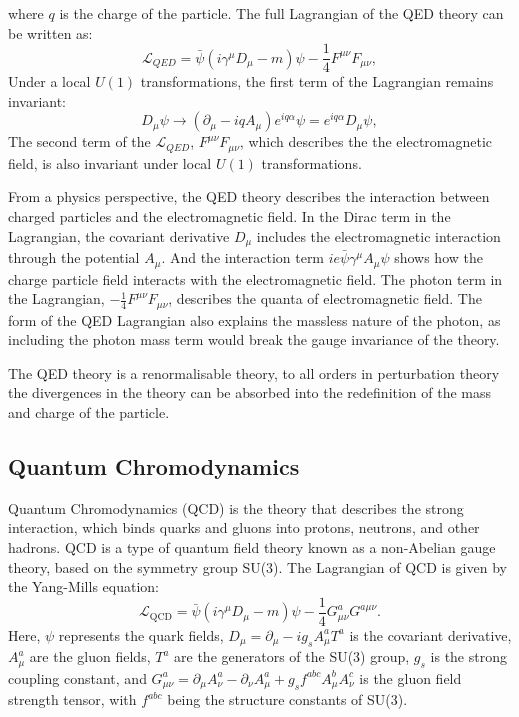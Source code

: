         where $q$ is the charge of the particle. The full Lagrangian of the QED theory can be written as:
        \begin{equation}
            \mathcal{L}_{QED} = \bar{\psi}(i\gamma^{\mu}D_{\mu} - m)\psi - \frac{1}{4}F^{\mu\nu}F_{\mu\nu},
        \end{equation}
        Under a local $U(1)$ transformations, the first term of the Lagrangian remains invariant:
        \begin{equation}
            D_{\mu}\psi \rightarrow (\partial_{\mu} - iqA_{\mu})e^{iq\alpha}\psi = e^{iq\alpha}D_{\mu}\psi,
        \end{equation}
        The second term of the $\mathcal{L}_{QED}$, $F^{\mu\nu}F_{\mu\nu}$, which describes the the electromagnetic field, 
        is also invariant under local $U(1)$ transformations. 

        From a physics perspective, the QED theory describes the interaction between charged particles and the electromagnetic field.
        In the Dirac term in the Lagrangian, the covariant derivative \( D_\mu \) includes the electromagnetic interaction through the potential \( A_\mu \).
        And the interaction term \( ie \bar{\psi} \gamma^\mu A_\mu \psi \) shows how the charge particle field interacts with the electromagnetic field.
        The photon term in the Lagrangian, \( -\frac{1}{4} F^{\mu\nu} F_{\mu\nu} \), describes the quanta of electromagnetic field.
        The form of the QED Lagrangian also explains the massless nature of the photon, as including the photon mass term would break the gauge invariance of the theory.

        The QED theory is a renormalisable theory, to all orders in perturbation theory
        the divergences in the theory can be absorbed
        into the redefinition of the mass and charge of the particle. 

    \subsection{Quantum Chromodynamics}
        Quantum Chromodynamics (QCD) is the theory that describes the strong interaction, 
        which binds quarks and gluons into protons, neutrons, and other hadrons. 
        QCD is a type of quantum field theory known as a non-Abelian gauge theory, 
        based on the symmetry group SU(3). The Lagrangian of QCD is given by 
        the Yang-Mills equation:
        \begin{equation} \label{eq:QCD_Lagrangian}
            \mathcal{L}_{\text{QCD}} = \bar{\psi}(i\gamma^\mu D_\mu - m)\psi - \frac{1}{4}G_{\mu\nu}^a G^{a\mu\nu}.
        \end{equation}
        Here, $\psi$ represents the quark fields, $D_\mu = \partial_\mu - ig_s A_\mu^a T^a$
        is the covariant derivative, $A_\mu^a$ are the gluon fields, $T^a$ are the generators 
        of the SU(3) group, $g_s$ is the strong coupling constant, and 
        $G_{\mu\nu}^a = \partial_\mu A_\nu^a - \partial_\nu A_\mu^a + g_s f^{abc}A_\mu^b A_\nu^c$
        is the gluon field strength tensor, with \(f^{abc}\) being the structure constants of SU(3).

